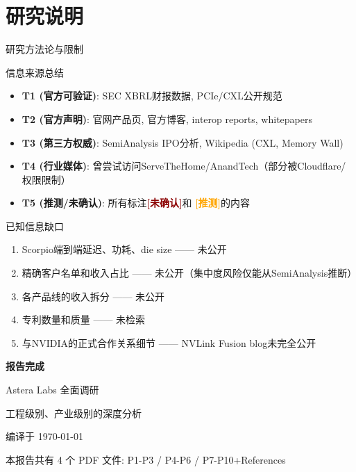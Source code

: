 \documentclass[UTF8,11pt,aspectratio=169]{beamer}
\newcommand{\unverified}{{\textcolor{darkred}{\textbf{[未确认]}}}}
\newcommand{\speculation}{{\textcolor{orange}{\textbf{[推测]}}}}
\begin{document}
\section{研究说明}

\begin{frame}{研究方法论与限制}
    \begin{block}{信息来源总结}
        \begin{itemize}
            \item \textbf{T1 (官方可验证)}: SEC XBRL财报数据, PCIe/CXL公开规范
            \item \textbf{T2 (官方声明)}: 官网产品页, 官方博客, interop reports, whitepapers
            \item \textbf{T3 (第三方权威)}: SemiAnalysis IPO分析, Wikipedia (CXL, Memory Wall)
            \item \textbf{T4 (行业媒体)}: 曾尝试访问ServeTheHome/AnandTech（部分被Cloudflare/权限限制）
            \item \textbf{T5 (推测/未确认)}: 所有标注\unverified 和 \speculation 的内容
        \end{itemize}
    \end{block}

    \begin{block}{已知信息缺口}
        \begin{enumerate}
            \item Scorpio端到端延迟、功耗、die size —— 未公开
            \item 精确客户名单和收入占比 —— 未公开（集中度风险仅能从SemiAnalysis推断）
            \item 各产品线的收入拆分 —— 未公开
            \item 专利数量和质量 —— 未检索
            \item 与NVIDIA的正式合作关系细节 —— NVLink Fusion blog未完全公开
        \end{enumerate}
    \end{block}
\end{frame}

\begin{frame}[plain]
    \centering
    \vspace{1.5cm}
    {\Huge \textbf{报告完成}}

    \vspace{1cm}
    {\Large Astera Labs 全面调研}

    \vspace{0.5cm}
    {\large 工程级别、产业级别的深度分析}

    \vspace{1cm}
    {\normalsize 编译于 \today}

    \vspace{0.5cm}
    {\footnotesize 本报告共有 4 个 PDF 文件: P1-P3 / P4-P6 / P7-P10+References}
\end{frame}
\end{document}
